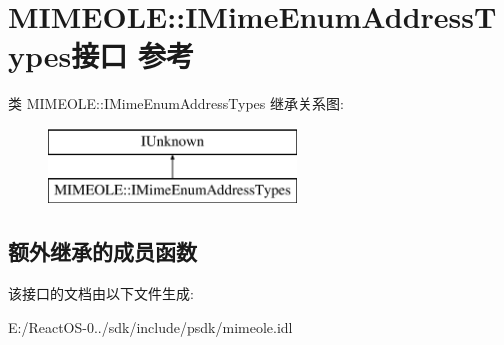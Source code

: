 \hypertarget{interface_m_i_m_e_o_l_e_1_1_i_mime_enum_address_types}{}\section{M\+I\+M\+E\+O\+LE\+:\+:I\+Mime\+Enum\+Address\+Types接口 参考}
\label{interface_m_i_m_e_o_l_e_1_1_i_mime_enum_address_types}
类 M\+I\+M\+E\+O\+LE\+:\+:I\+Mime\+Enum\+Address\+Types 继承关系图\+:\begin{figure}[H]
\begin{center}
\leavevmode
\includegraphics[height=2.000000cm]{interface_m_i_m_e_o_l_e_1_1_i_mime_enum_address_types}
\end{center}
\end{figure}
\subsection*{额外继承的成员函数}


该接口的文档由以下文件生成\+:\begin{DoxyCompactItemize}
\item 
E\+:/\+React\+O\+S-\/0../sdk/include/psdk/mimeole.\+idl\end{DoxyCompactItemize}
